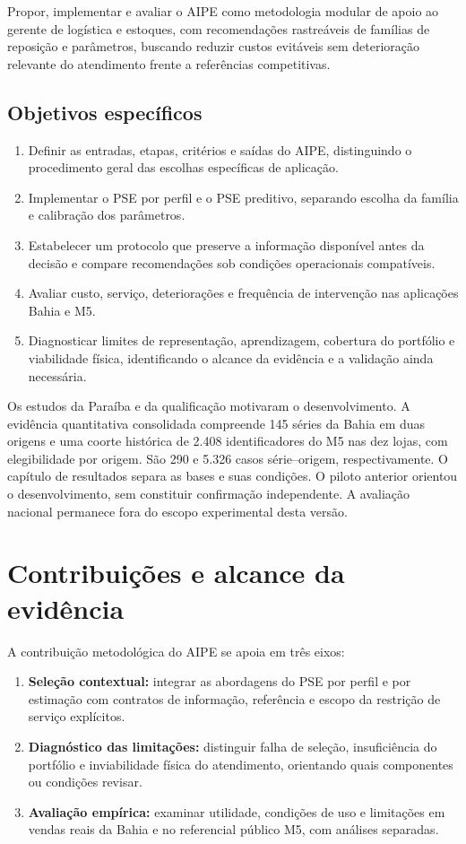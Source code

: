 Propor, implementar e avaliar o AIPE como metodologia modular de apoio ao gerente de logística e estoques, com recomendações rastreáveis de famílias de reposição e parâmetros, buscando reduzir custos evitáveis sem deterioração relevante do atendimento frente a referências competitivas.

\subsection*{Objetivos específicos}

\begin{enumerate}
  \item Definir as entradas, etapas, critérios e saídas do AIPE, distinguindo o procedimento geral das escolhas específicas de aplicação.
  \item Implementar o PSE por perfil e o PSE preditivo, separando escolha da família e calibração dos parâmetros.
  \item Estabelecer um protocolo que preserve a informação disponível antes da decisão e compare recomendações sob condições operacionais compatíveis.
  \item Avaliar custo, serviço, deteriorações e frequência de intervenção nas aplicações Bahia e M5.
  \item Diagnosticar limites de representação, aprendizagem, cobertura do portfólio e viabilidade física, identificando o alcance da evidência e a validação ainda necessária.
\end{enumerate}

Os estudos da Paraíba e da qualificação motivaram o desenvolvimento. A evidência quantitativa consolidada compreende 145 séries da Bahia em duas origens e uma coorte histórica de 2.408 identificadores do M5 nas dez lojas, com elegibilidade por origem. São 290 e 5.326 casos série--origem, respectivamente. O capítulo de resultados separa as bases e suas condições. O piloto anterior orientou o desenvolvimento, sem constituir confirmação independente. A avaliação nacional permanece fora do escopo experimental desta versão.

\section{Contribuições e alcance da evidência}

A contribuição metodológica do AIPE se apoia em três eixos:
\begin{enumerate}
  \item \textbf{Seleção contextual:} integrar as abordagens do PSE por perfil e por estimação com contratos de informação, referência e escopo da restrição de serviço explícitos.
  \item \textbf{Diagnóstico das limitações:} distinguir falha de seleção, insuficiência do portfólio e inviabilidade física do atendimento, orientando quais componentes ou condições revisar.
  \item \textbf{Avaliação empírica:} examinar utilidade, condições de uso e limitações em vendas reais da Bahia e no referencial público M5, com análises separadas.
\end{enumerate}

